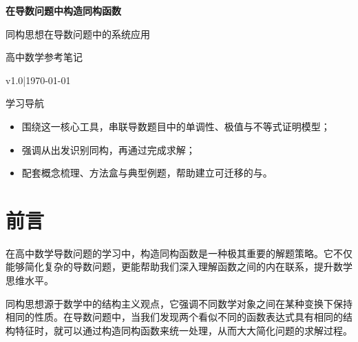 \documentclass[a4paper,11pt]{ctexrep}
\theoremstyle{definition}
\renewcommand{\notetitle}{在导数问题中构造同构函数}
\renewcommand{\noteauthor}{高中数学参考笔记}
\renewcommand{\notedate}{\today}
\renewcommand{\notesubtitle}{同构思想在导数问题中的系统应用}
\renewcommand{\noteversion}{v1.0}
\begin{document}
\thispagestyle{empty}
\setcounter{page}{1}

\noindent
\begin{minipage}[t][0.7\textheight][c]{\textwidth}
  \raggedleft
  \vspace*{\fill}
  {\sffamily\bfseries\Huge\color{accent}\notetitle\par}
  \vspace{0.6em}
  {\Large\color{inkgray}\notesubtitle\par}
  \vspace{0.5em}
  {\large\color{inkgray}\noteauthor\par}
  \vspace{0.4em}
  {\normalsize\color{inkgray}\noteversion\quad|\quad\notedate\par}
  \vspace*{\fill}
\end{minipage}

\begin{center}
\begin{minipage}{0.84\textwidth}
  \textcolor{inkgray}{\sffamily\small 学习导航}\\
  \begin{itemize}
    \item 围绕这一核心工具，串联导数题目中的单调性、极值与不等式证明模型；
    \item 强调从出发识别同构，再通过完成求解；
    \item 配套概念梳理、方法盒与典型例题，帮助建立可迁移的与。
  \end{itemize}
\end{minipage}
\end{center}
\vspace{1em}

\clearpage
\thispagestyle{plain}

\tableofcontents
\newpage

\chapter*{\heiti 前言}

在高中数学导数问题的学习中，构造同构函数是一种极其重要的解题策略。它不仅能够简化复杂的导数问题，更能帮助我们深入理解函数之间的内在联系，提升数学思维水平。

同构思想源于数学中的结构主义观点，它强调不同数学对象之间在某种变换下保持相同的性质。在导数问题中，当我们发现两个看似不同的函数表达式具有相同的结构特征时，就可以通过构造同构函数来统一处理，从而大大简化问题的求解过程。
\end{document}
